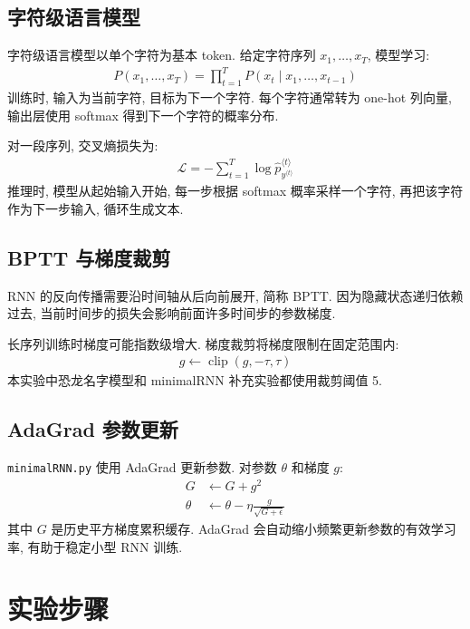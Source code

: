 \documentclass{../../nndlcourse}
\begin{document}
\subsection{字符级语言模型}

字符级语言模型以单个字符为基本 token. 给定字符序列 $x_1,\ldots,x_T$, 模型学习:
\begin{align}
    P(x_1,\ldots,x_T)=\prod_{t=1}^{T}P(x_t\mid x_1,\ldots,x_{t-1})
\end{align}
训练时, 输入为当前字符, 目标为下一个字符. 每个字符通常转为 one-hot 列向量, 输出层使用 softmax 得到下一个字符的概率分布.

对一段序列, 交叉熵损失为:
\begin{align}
    \mathcal{L} = -\sum_{t=1}^{T}\log \hat{p}^{\langle t\rangle}_{y^{\langle t\rangle}}
\end{align}
推理时, 模型从起始输入开始, 每一步根据 softmax 概率采样一个字符, 再把该字符作为下一步输入, 循环生成文本.

\subsection{BPTT 与梯度裁剪}

RNN 的反向传播需要沿时间轴从后向前展开, 简称 BPTT. 因为隐藏状态递归依赖过去, 当前时间步的损失会影响前面许多时间步的参数梯度.

长序列训练时梯度可能指数级增大. 梯度裁剪将梯度限制在固定范围内:
\begin{align}
    g \leftarrow \operatorname{clip}(g, -\tau, \tau)
\end{align}
本实验中恐龙名字模型和 minimalRNN 补充实验都使用裁剪阈值 5.

\subsection{AdaGrad 参数更新}

\texttt{minimalRNN.py} 使用 AdaGrad 更新参数. 对参数 $\theta$ 和梯度 $g$:
\begin{align}
    G &\leftarrow G + g^2 \\
    \theta &\leftarrow \theta - \eta \frac{g}{\sqrt{G+\epsilon}}
\end{align}
其中 $G$ 是历史平方梯度累积缓存. AdaGrad 会自动缩小频繁更新参数的有效学习率, 有助于稳定小型 RNN 训练.


\section{实验步骤}
\end{document}
